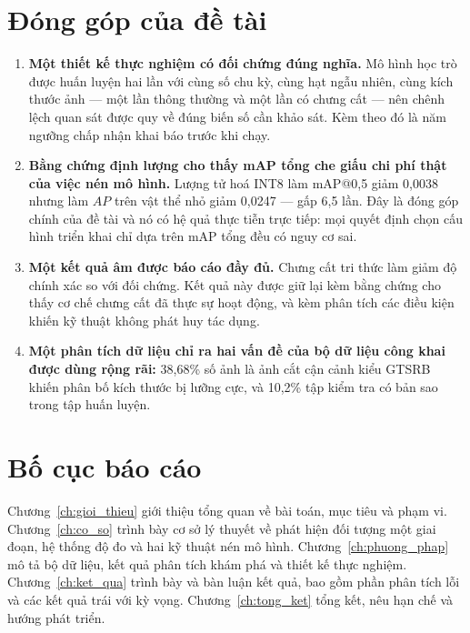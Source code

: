 \section{Đóng góp của đề tài}

\begin{enumerate}[leftmargin=1.5cm]
\item \textbf{Một thiết kế thực nghiệm có đối chứng đúng nghĩa.} Mô hình học trò được huấn luyện
hai lần với cùng số chu kỳ, cùng hạt ngẫu nhiên, cùng kích thước ảnh --- một lần thông thường và
một lần có chưng cất --- nên chênh lệch quan sát được quy về đúng biến số cần khảo sát. Kèm theo đó
là năm ngưỡng chấp nhận khai báo trước khi chạy.

\item \textbf{Bằng chứng định lượng cho thấy mAP tổng che giấu chi phí thật của việc nén mô hình.}
Lượng tử hoá INT8 làm mAP@0,5 giảm 0,0038 nhưng làm $AP$ trên vật thể nhỏ giảm 0,0247 --- gấp 6,5
lần. Đây là đóng góp chính của đề tài và nó có hệ quả thực tiễn trực tiếp: mọi quyết định chọn cấu
hình triển khai chỉ dựa trên mAP tổng đều có nguy cơ sai.

\item \textbf{Một kết quả âm được báo cáo đầy đủ.} Chưng cất tri thức làm giảm độ chính xác so với
đối chứng. Kết quả này được giữ lại kèm bằng chứng cho thấy cơ chế chưng cất đã thực sự hoạt động,
và kèm phân tích các điều kiện khiến kỹ thuật không phát huy tác dụng.

\item \textbf{Một phân tích dữ liệu chỉ ra hai vấn đề của bộ dữ liệu công khai được dùng rộng rãi:}
38,68\% số ảnh là ảnh cắt cận cảnh kiểu GTSRB~\cite{stallkamp2012gtsrb} khiến phân bố kích thước bị
lưỡng cực, và 10,2\% tập kiểm tra có bản sao trong tập huấn luyện.
\end{enumerate}

\section{Bố cục báo cáo}

Chương~\ref{ch:gioi_thieu} giới thiệu tổng quan về bài toán, mục tiêu và phạm vi.
Chương~\ref{ch:co_so} trình bày cơ sở lý thuyết về phát hiện đối tượng một giai đoạn, hệ thống độ
đo và hai kỹ thuật nén mô hình. Chương~\ref{ch:phuong_phap} mô tả bộ dữ liệu, kết quả phân tích
khám phá và thiết kế thực nghiệm. Chương~\ref{ch:ket_qua} trình bày và bàn luận kết quả, bao gồm
phần phân tích lỗi và các kết quả trái với kỳ vọng. Chương~\ref{ch:tong_ket} tổng kết, nêu hạn chế
và hướng phát triển.
